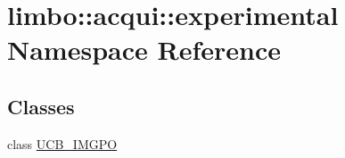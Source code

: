 \hypertarget{namespacelimbo_1_1acqui_1_1experimental}{}\section{limbo\+:\+:acqui\+:\+:experimental Namespace Reference}
\label{namespacelimbo_1_1acqui_1_1experimental}
\subsection*{Classes}
\begin{DoxyCompactItemize}
\item 
class \hyperlink{classlimbo_1_1acqui_1_1experimental_1_1_u_c_b___i_m_g_p_o}{U\+C\+B\+\_\+\+I\+M\+G\+PO}
\end{DoxyCompactItemize}
